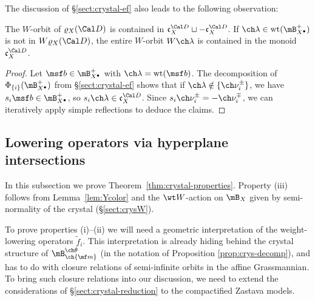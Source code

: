The discussion of \S\ref{sect:crystal-ef} also leads to the following observation:

\begin{lem}
\notready \label{lem:plusWorbits}
The $W$-orbit of $\varrho_X(\Cal D)$ is contained in $\mathfrak c_X^{\Cal D} \sqcup -\mathfrak c_X^{\Cal D}$.
If $\ch\lambda\in \mathrm{wt}(\mB_{X^\bullet}^+)$ is not in $W\varrho_X(\Cal D)$, the entire
$W$-orbit $W\ch\lambda$ is contained in the monoid $\mathfrak c_X^{\Cal D}$.
\end{lem}
\begin{proof} Let $\msf b \in \mB_{X^\bullet}^+$ with $\ch\lambda=\mathrm{wt}(\msf b)$.
The decomposition of $\Phi_{\{i\}}(\mB_{X^\bullet}^+)$ from \S\ref{sect:crystal-ef}
shows that if $\ch\lambda \notin \{\ch\nu_i^\pm\}$,
we have $s_i\msf b \in \mB^+_{X^\bullet}$, so $s_i\ch\lambda\in \mathfrak c_X^{\Cal D}$.
Since $s_i \ch\nu_i^\pm = -\ch\nu_i^\mp$, we can iteratively
apply simple reflections to deduce the claims.
\end{proof}



\subsection{Lowering operators via hyperplane intersections} \label{sect:crystal-hw}

In this subsection we prove Theorem~\ref{thm:crystal-properties}.
Property (iii) follows from Lemma~\ref{lem:Ycolor} and the $\wt W$-action on $\mB_X$
given by semi-normality of the crystal (\S\ref{sect:crysW}).


To prove properties (i)--(ii) we will need a geometric interpretation of the weight-lowering operators $\tilde f_i$.
This interpretation is already hiding behind the crystal structure of $\mB^{\ch\theta}_{\ch{\mf m}}$ (in the notation of Proposition \ref{prop:crys-decomp}), and has to do with closure relations of semi-infinite orbits in the affine Grassmannian. To bring such closure relations into our discussion, we need to extend the considerations of \S \ref{sect:crystal-reduction} to the compactified Zastava models.

